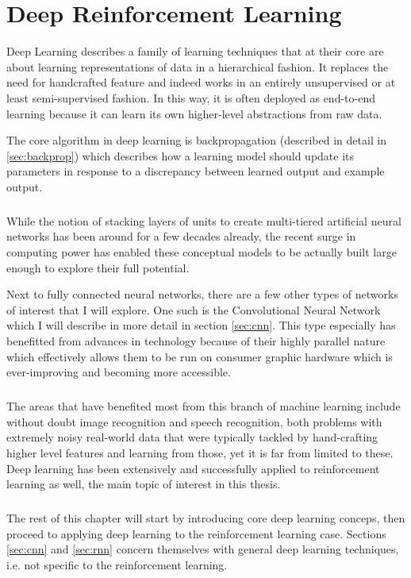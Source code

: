 \chapter{Deep Reinforcement Learning}
Deep Learning describes a family of learning techniques
that at their core are about learning representations of data
in a hierarchical fashion.
It replaces the need for handcrafted feature
and indeed works in an entirely unsupervised or at least
semi-supervised fashion.
In this way,
it is often deployed as end-to-end learning
because it can learn its own higher-level abstractions
from raw data.

The core algorithm in deep learning is backpropagation
(described in detail in \ref{sec:backprop})
which describes how a learning model should update its parameters
in response to a discrepancy between learned output
and example output.

\paragraph{}
While the notion of stacking layers of units
to create multi-tiered artificial neural networks
has been around for a few decades already,
the recent surge in computing power
has enabled these conceptual models
to be actually built large enough
to explore their full potential.

Next to fully connected neural networks,
there are a few other types of networks of interest
that I will explore.
One such is the Convolutional Neural Network
which I will describe in more detail in
section \ref{sec:cnn}.
This type especially has benefitted from
advances in technology because of their highly
parallel nature which effectively allows them to be run
on consumer graphic hardware which is ever-improving
and becoming more accessible.

\paragraph{}
The areas that have benefited most from
this branch of machine learning
include without doubt
image recognition and speech recognition,
both problems with extremely noisy real-world data
that were typically tackled
by hand-crafting higher level features
and learning from those,
yet it is far from limited to these.
Deep learning has been extensively and successfully
applied to reinforcement learning as well,
the main topic of interest in this thesis.

\paragraph{}
The rest of this chapter will start by introducing
core deep learning conceps,
then proceed to applying deep learning
to the reinforcement learning case.
Sections \ref{sec:cnn} and \ref{sec:rnn}
concern themselves with general deep learning techniques,
i.e. not specific to the reinforcement learning.

